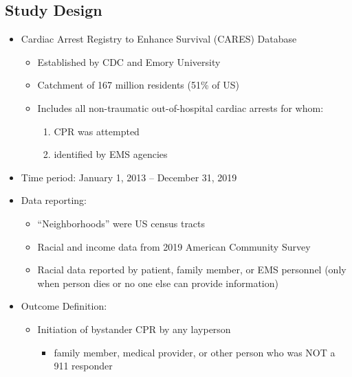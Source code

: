\documentclass{beamer}
\begin{document}
	\subsection{Study Design}
		\begin{frame}
			\begin{itemize}
				\item Cardiac Arrest Registry to Enhance Survival (CARES) Database
					\begin{itemize}
						\item Established by CDC and Emory University
						\item Catchment of 167 million residents (51\% of US)
						\item Includes all non-traumatic out-of-hospital cardiac arrests for whom:
							\begin{enumerate}
								\item CPR was attempted
								\item identified by EMS agencies
							\end{enumerate}
					\end{itemize}
				\item Time period: January 1, 2013 -- December 31, 2019
				\item Data reporting:
					\begin{itemize}
						\item ``Neighborhoods'' were US census tracts
						\item Racial and income data from 2019 American Community Survey
						\item Racial data reported by patient, family member, or EMS personnel (only when person dies or no one else can provide information)
					\end{itemize}
				\item Outcome Definition:
					\begin{itemize}
						\item Initiation of bystander CPR by any layperson
							\begin{itemize}
								\item family member, medical provider, or other person who was NOT a 911 responder
							\end{itemize}
					\end{itemize}
			\end{itemize}
		\end{frame}
\end{document}
